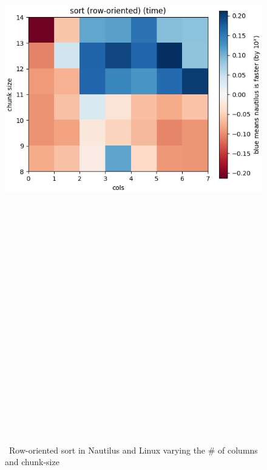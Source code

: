 
\begin{figure}
  \includegraphics[height=30cm]{plots/sort_2d.png}
  \label{fig:sort_2d}
  \caption{~Row-oriented sort in Nautilus and Linux varying the \# of columns and chunk-size}
\end{figure}

